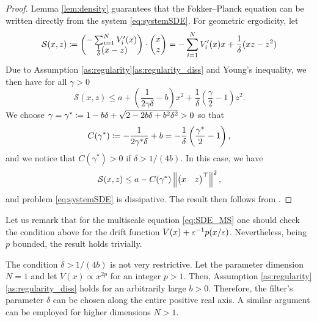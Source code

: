 \documentclass[10pt]{article}
\begin{document}
\begin{proof} Lemma \ref{lem:density} guarantees that the Fokker--Planck equation can be written directly from the system \eqref{eq:systemSDE}. For geometric ergodicity, let 
\begin{equation}
	 \mathcal S(x,z) \coloneqq \begin{pmatrix} -\sum_{i=1}^N V_i'(x) \\ \frac1\delta (x - z) \end{pmatrix} \cdot \begin{pmatrix} x \\ z \end{pmatrix} = -\sum_{i=1}^N V_i'(x)x+\frac1\delta(xz-z^2)
\end{equation}
Due to Assumption \ref{as:regularity}\ref{as:regularity_diss} and Young's inequality, we then have for all $\gamma > 0$
\begin{equation}
	\mathcal S(x,z) \leq a + \left(\frac{1}{2\gamma\delta} - b\right)x^2 + \frac1\delta\left(\frac{\gamma}{2} - 1\right)z^2.
\end{equation}
We choose $\gamma = \gamma^* \coloneqq 1 - b\delta + \sqrt{2-2b\delta+b^2\delta^2} > 0$ so that
\begin{equation}
	C(\gamma^*) \coloneqq -\frac{1}{2\gamma^*\delta} + b = -\frac1\delta\left(\frac{\gamma^*}{2} - 1\right),
\end{equation}
and we notice that $C(\gamma^*) > 0$ if $\delta > 1/(4b)$. In this case, we have
\begin{equation}
	\mathcal S(x, z) \leq a - C(\gamma^*) \left\|\begin{pmatrix} x & z \end{pmatrix}^\top\right\|^2,
\end{equation}
and problem \eqref{eq:systemSDE} is dissipative. The result then follows from \cite[Theorem 4.4]{MSH02}.
\end{proof}

\begin{remark} Let us remark that for the multiscale equation \eqref{eq:SDE_MS} one should check the condition above for the drift function $V(x) + \varepsilon^{-1}p(x/\varepsilon)$. Nevertheless, being $p$ bounded, the result holds trivially.  
\end{remark}

\begin{remark} The condition $\delta > 1 / (4b)$ is not very restrictive. Let the parameter dimension $N = 1$ and let $V(x) \propto x^{2p}$ for an integer $p > 1$. Then, Assumption \ref{as:regularity}\ref{as:regularity_diss} holds for an arbitrarily large $b > 0$. Therefore, the filter's parameter $\delta$ can be chosen along the entire positive real axis. A similar argument can be employed for higher dimensions $N > 1$.
\end{remark}
\end{document}
